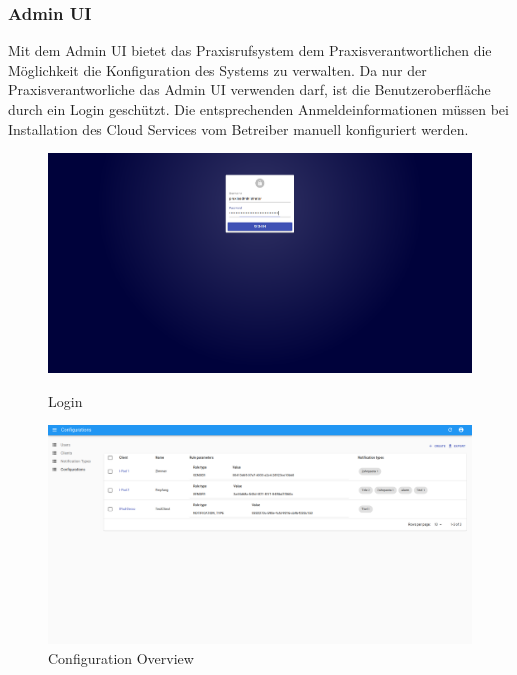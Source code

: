 \subsubsection{Admin UI}

Mit dem Admin UI bietet das Praxisrufsystem dem Praxisverantwortlichen die Möglichkeit die Konfiguration des Systems zu verwalten.
Da nur der Praxisverantworliche das Admin UI verwenden darf, ist die Benutzeroberfläche durch ein Login geschützt.
Die entsprechenden Anmeldeinformationen müssen bei Installation des Cloud Services vom Betreiber manuell konfiguriert werden.

\begin{figure}[h]
    \centering
    \begin{minipage}[b]{0.4\textwidth}
        \includegraphics[width=\textwidth]{graphics/screenshots/adminui/login}
        \caption{Login}
    \end{minipage}
    \hfill
    \begin{minipage}[b]{0.4\textwidth}
        \includegraphics[width=\textwidth]{graphics/screenshots/adminui/configuration-all}
        \caption{Configuration Overview}
    \end{minipage}
    \label{fig:AdminUI-Screens1}
\end{figure}

